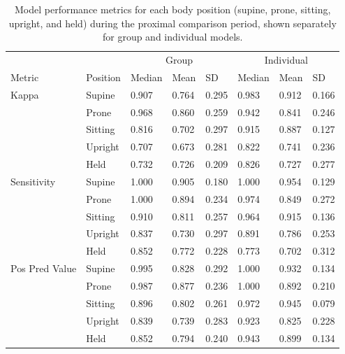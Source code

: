 \documentclass[
  man]{apa6}
\begin{document}
\begin{table}[tbp]

\begin{center}
\begin{threeparttable}

\caption{\label{tab:metrics-by-class}Model performance metrics for each body position (supine, prone, sitting, upright, and held) during the proximal comparison period, shown separately for group and individual models.}

\begin{tabular}{llllllll}
\toprule
 &  & \multicolumn{3}{c}{Group} & \multicolumn{3}{c}{Individual} \\
\cmidrule(r){3-5} \cmidrule(r){6-8}
Metric & Position & Median & Mean & SD & Median & Mean & SD\\
\midrule
Kappa & Supine & 0.907 & 0.764 & 0.295 & 0.983 & 0.912 & 0.166\\
 & Prone & 0.968 & 0.860 & 0.259 & 0.942 & 0.841 & 0.246\\
 & Sitting & 0.816 & 0.702 & 0.297 & 0.915 & 0.887 & 0.127\\
 & Upright & 0.707 & 0.673 & 0.281 & 0.822 & 0.741 & 0.236\\
 & Held & 0.732 & 0.726 & 0.209 & 0.826 & 0.727 & 0.277\\ \midrule
Sensitivity & Supine & 1.000 & 0.905 & 0.180 & 1.000 & 0.954 & 0.129\\
 & Prone & 1.000 & 0.894 & 0.234 & 0.974 & 0.849 & 0.272\\
 & Sitting & 0.910 & 0.811 & 0.257 & 0.964 & 0.915 & 0.136\\
 & Upright & 0.837 & 0.730 & 0.297 & 0.891 & 0.786 & 0.253\\
 & Held & 0.852 & 0.772 & 0.228 & 0.773 & 0.702 & 0.312\\ \midrule
Pos Pred Value & Supine & 0.995 & 0.828 & 0.292 & 1.000 & 0.932 & 0.134\\
 & Prone & 0.987 & 0.877 & 0.236 & 1.000 & 0.892 & 0.210\\
 & Sitting & 0.896 & 0.802 & 0.261 & 0.972 & 0.945 & 0.079\\
 & Upright & 0.839 & 0.739 & 0.283 & 0.923 & 0.825 & 0.228\\
 & Held & 0.852 & 0.794 & 0.240 & 0.943 & 0.899 & 0.134\\
\bottomrule
\end{tabular}

\end{threeparttable}
\end{center}

\end{table}
\end{document}
